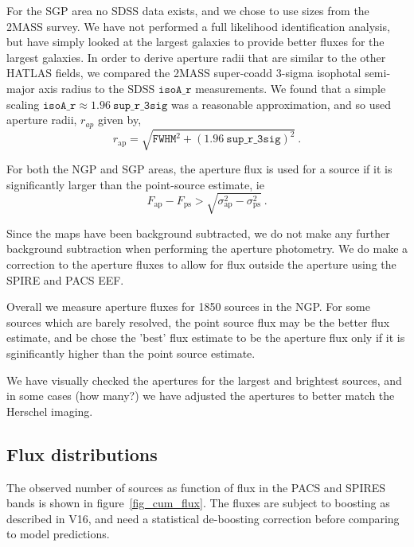 \documentclass[useAMS,usenatbib]{mn2e}
\begin{document}
For the SGP area no SDSS data exists, and we chose to use sizes
from the 2MASS survey. We have not performed a full likelihood
identification analysis, but have simply looked at the largest
galaxies to provide better fluxes for the largest galaxies. 
In order to derive aperture radii that are similar to the other HATLAS
fields, we compared the 2MASS super-coadd 3-sigma isophotal semi-major
axis radius to the SDSS $\mathtt {isoA\_r}$ measurements. We found that a
simple scaling $\mathtt{isoA\_r} \approx 1.96 \ \mathtt{sup\_r\_3sig}$
was a reasonable approximation, and so used aperture radii, $r_{ap}$
given by, 
\begin{equation} 
r_\mathrm{ap} = \sqrt{ \mathtt{FWHM}^2 + {(1.96
    \ \mathtt{sup\_r\_3sig})}^2}\ .
\end{equation}

For both the NGP and SGP areas, the aperture flux is used for a source
if it is significantly larger than the point-source estimate, ie
\begin{equation} 
F_\mathrm{ap}- F_\mathrm{ps}>\sqrt{\sigma_\mathrm{ap}^2-\sigma_\mathrm{ps}^2}
\ .
\end{equation}

Since the maps have been background subtracted, we do not make any
further background subtraction when performing the aperture
photometry. We do make a correction to the aperture fluxes to allow
for flux outside the aperture using the SPIRE and PACS EEF.

Overall we measure aperture fluxes for 1850 sources in the NGP. For
some sources which are barely resolved, the point source flux may be
the better flux estimate, and be chose the 'best' flux estimate to be
the aperture flux only if it is sginificantly higher than the point
source estimate. 

We have visually checked the apertures for the largest and brightest
sources, and in some cases (how many?) we have adjusted the apertures
to better match the Herschel imaging. 

\subsection{Flux distributions} 

The observed number of sources as  function of flux in the PACS and
SPIRES bands is shown in figure~\ref{fig_cum_flux}. The fluxes are
subject to boosting as described in V16, and need a statistical
de-boosting correction before  comparing to model predictions. 
\end{document}
